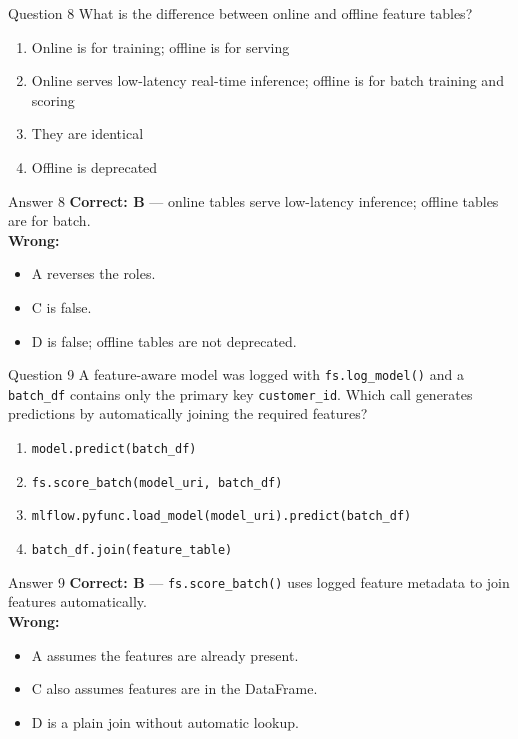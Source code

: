 \documentclass[aspectratio=169,11pt]{beamer}
\begin{document}
	\begin{frame}{Question 8}
		What is the difference between online and offline feature tables?
		\begin{enumerate}[label=\Alph*.]
			\item Online is for training; offline is for serving
			\item Online serves low-latency real-time inference; offline is for batch training and scoring
			\item They are identical
			\item Offline is deprecated
		\end{enumerate}
	\end{frame}
	\begin{frame}{Answer 8}
		\textbf{Correct: B} --- online tables serve low-latency inference; offline tables are for batch.\\
		\vspace{0.5em}
		\textbf{Wrong:}
		\begin{itemize}
			\item A reverses the roles.
			\item C is false.
			\item D is false; offline tables are not deprecated.
		\end{itemize}
	\end{frame}
	
	\begin{frame}{Question 9}
		A feature-aware model was logged with \texttt{fs.log\_model()} and a \texttt{batch\_df} contains only the primary key \texttt{customer\_id}. Which call generates predictions by automatically joining the required features?
		\begin{enumerate}[label=\Alph*.]
			\item \texttt{model.predict(batch\_df)}
			\item \texttt{fs.score\_batch(model\_uri, batch\_df)}
			\item \texttt{mlflow.pyfunc.load\_model(model\_uri).predict(batch\_df)}
			\item \texttt{batch\_df.join(feature\_table)}
		\end{enumerate}
	\end{frame}
	\begin{frame}{Answer 9}
		\textbf{Correct: B} --- \texttt{fs.score\_batch()} uses logged feature metadata to join features automatically.\\
		\vspace{0.5em}
		\textbf{Wrong:}
		\begin{itemize}
			\item A assumes the features are already present.
			\item C also assumes features are in the DataFrame.
			\item D is a plain join without automatic lookup.
		\end{itemize}
	\end{frame}
	
\end{document}
